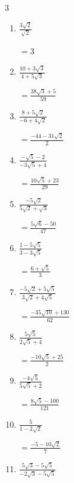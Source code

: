 \begin{multicols}{3}
\begin{enumerate}
        $\displaystyle =\frac{15+5\sqrt{15}}{4}$

  \item $\displaystyle \frac{3\sqrt{2}}{\sqrt{2}}$

        $\displaystyle =3$

  \item $\displaystyle \frac{10+3\sqrt{3}}{4+5\sqrt{3}}$

        $\displaystyle =\frac{38\sqrt{3}+5}{59}$

  \item $\displaystyle \frac{8+5\sqrt{2}}{-6+4\sqrt{2}}$

        $\displaystyle =\frac{-44-31\sqrt{2}}{2}$

  \item $\displaystyle \frac{-\sqrt{5}-2}{-3\sqrt{5}+4}$

        $\displaystyle =\frac{10\sqrt{5}+23}{29}$

\columnbreak %

\resetques

  \item $\displaystyle \frac{-5\sqrt{2}}{5\sqrt{2}+\sqrt{3}}$

        $\displaystyle =\frac{5\sqrt{6}-50}{47}$

  \item $\displaystyle \frac{1-5\sqrt{5}}{3-3\sqrt{5}}$

        $\displaystyle =\frac{6+\sqrt{5}}{3}$

  \item $\displaystyle \frac{-5\sqrt{2}+5\sqrt{5}}{3\sqrt{2}+4\sqrt{5}}$

        $\displaystyle =\frac{-35\sqrt{10}+130}{62}$

  \item $\displaystyle \frac{5\sqrt{5}}{2\sqrt{5}+4}$

        $\displaystyle =\frac{-10\sqrt{5}+25}{2}$

  \item $\displaystyle \frac{-4\sqrt{5}}{5\sqrt{5}+2}$

        $\displaystyle =\frac{8\sqrt{5}-100}{121}$

\columnbreak %

  \item $\displaystyle \frac{5}{1-2\sqrt{2}}$

        $\displaystyle =\frac{-5-10\sqrt{2}}{7}$

  \item $\displaystyle \frac{5\sqrt{3}-5\sqrt{5}}{-2\sqrt{3}-5\sqrt{5}}$


\end{enumerate}
\end{multicols}

